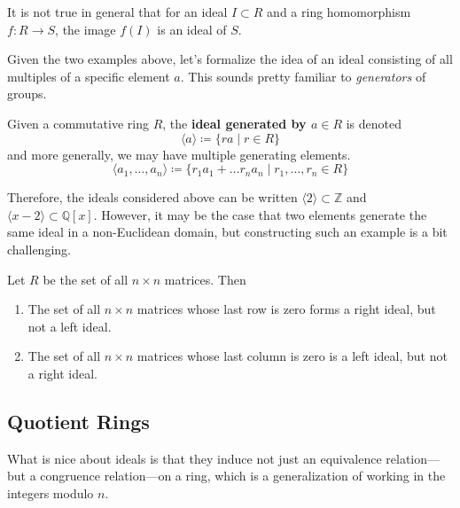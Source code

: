   \begin{example}
    It is not true in general that for an ideal $I \subset R$ and a ring homomorphism $f: R \to S$, the image $f(I)$ is an ideal of $S$. 
  \end{example}

  Given the two examples above, let's formalize the idea of an ideal consisting of all multiples of a specific element $a$. This sounds pretty familiar to \textit{generators} of groups. 

  \begin{definition}
    Given a commutative ring $R$, the \textbf{ideal generated by $a \in R$} is denoted 
    \begin{equation}
      \langle a \rangle \coloneqq \{r a \mid r \in R\}
    \end{equation}
    and more generally, we may have multiple generating elements. 
    \begin{equation}
      \langle a_1, \ldots, a_n \rangle \coloneqq \{ r_1 a_1 + \ldots r_n a_n \mid r_1, \ldots, r_n \in R \}
    \end{equation}
  \end{definition}

  Therefore, the ideals considered above can be written $\langle 2 \rangle \subset \mathbb{Z}$ and $\langle x - 2 \rangle \subset \mathbb{Q}[x]$. However, it may be the case that two elements generate the same ideal in a non-Euclidean domain, but constructing such an example is a bit challenging.   

  \begin{example}
    Let $R$ be the set of all $n \times n$ matrices. Then 
    \begin{enumerate}
      \item The set of all $n \times n$ matrices whose last row is zero forms a right ideal, but not a left ideal.
      \item The set of all $n\times n$ matrices whose last column is zero is a left ideal, but not a right ideal. 
    \end{enumerate}
  \end{example}

\subsection{Quotient Rings}

  What is nice about ideals is that they induce not just an equivalence relation---but a congruence relation---on a ring, which is a generalization of working in the integers modulo $n$. 

